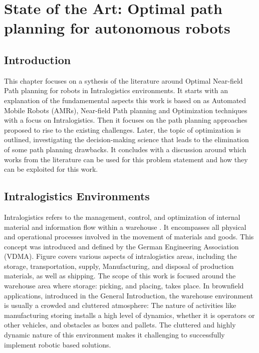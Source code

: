 \chapter{State of the Art: Optimal path planning for autonomous robots}

\renewcommand{\chaptername}{Chapter}

\section*{Introduction}
This chapter focuses on a sythesis of the literature around Optimal Near-field Path planning
for robots in Intralogistics environments. 
It starts with an explanation of the fundamemental aspects this work is based on 
as Automated Mobile Robots (AMRs), Near-field Path planning and Optimization techniques 
with a focus on Intralogistics.
Then it focuses on the path planning approaches proposed to rise to the existing challenges.
Later, the topic of optimization is outlined, investigating the decision-making science
that leads to the elimination of some path planning drawbacks.
It concludes with a discussion around which works from the literature can be used for this problem 
statement and how they can be exploited for this work.

\section{Intralogistics Environments}
Intralogistics refers to the management, control, and optimization of internal material and 
information flow within a warehouse . It encompasses all physical and operational processes 
involved in the movement of materials and goods. This concept was introduced and defined by 
the German Engineering Association (VDMA). Figure  covers various aspects of 
intralogistics areas, including 
the storage, transportation, supply, Manufacturing, and disposal of production materials, as well as 
shipping. 
The scope of this work is focused around the warehouse 
area where storage: picking, and placing, takes place. 
In brownfield applications, introduced in the General Introduction, the warehouse environment is 
usually a crowded and cluttered 
atmosphere: The nature of activities like manufacturing storing installs a high level of 
dynamics, whether it is operators or other vehicles, and obstacles as boxes and pallets. 
The cluttered 
and highly dynamic nature of this environment makes it challenging to successfully 
implement robotic based solutions.

